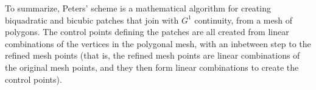 To summarize, Peters' scheme is a mathematical algorithm for creating biquadratic and bicubic \Bez patches that join with $G^1$ continuity, from a mesh of polygons. The \Bez control points defining the patches are all created from linear combinations of the vertices in the polygonal mesh, with an inbetween step to the refined mesh points (that is, the refined mesh points are linear combinations of the original mesh points, and they then form linear combinations to create the \Bez control points).

%


%
